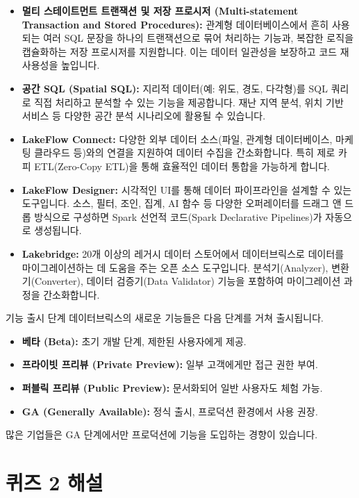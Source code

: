 \documentclass[11pt,a4paper]{article}
\begin{document}
\begin{itemize}
    \item \textbf{멀티 스테이트먼트 트랜잭션 및 저장 프로시저 (Multi-statement Transaction and Stored Procedures):} 관계형 데이터베이스에서 흔히 사용되는 여러 SQL 문장을 하나의 트랜잭션으로 묶어 처리하는 기능과, 복잡한 로직을 캡슐화하는 저장 프로시저를 지원합니다. 이는 데이터 일관성을 보장하고 코드 재사용성을 높입니다.
    \item \textbf{공간 SQL (Spatial SQL):} 지리적 데이터(예: 위도, 경도, 다각형)를 SQL 쿼리로 직접 처리하고 분석할 수 있는 기능을 제공합니다. 재난 지역 분석, 위치 기반 서비스 등 다양한 공간 분석 시나리오에 활용될 수 있습니다.
    \item \textbf{LakeFlow Connect:} 다양한 외부 데이터 소스(파일, 관계형 데이터베이스, 마케팅 클라우드 등)와의 연결을 지원하여 데이터 수집을 간소화합니다. 특히 제로 카피 ETL(Zero-Copy ETL)을 통해 효율적인 데이터 통합을 가능하게 합니다.
    \item \textbf{LakeFlow Designer:} 시각적인 UI를 통해 데이터 파이프라인을 설계할 수 있는 도구입니다. 소스, 필터, 조인, 집계, AI 함수 등 다양한 오퍼레이터를 드래그 앤 드롭 방식으로 구성하면 Spark 선언적 코드(Spark Declarative Pipelines)가 자동으로 생성됩니다.
    \item \textbf{Lakebridge:} 20개 이상의 레거시 데이터 스토어에서 데이터브릭스로 데이터를 마이그레이션하는 데 도움을 주는 오픈 소스 도구입니다. 분석기(Analyzer), 변환기(Converter), 데이터 검증기(Data Validator) 기능을 포함하여 마이그레이션 과정을 간소화합니다.
\end{itemize}

\begin{cautionbox}{기능 출시 단계}
데이터브릭스의 새로운 기능들은 다음 단계를 거쳐 출시됩니다.
\begin{itemize}
    \item \textbf{베타 (Beta):} 초기 개발 단계, 제한된 사용자에게 제공.
    \item \textbf{프라이빗 프리뷰 (Private Preview):} 일부 고객에게만 접근 권한 부여.
    \item \textbf{퍼블릭 프리뷰 (Public Preview):} 문서화되어 일반 사용자도 체험 가능.
    \item \textbf{GA (Generally Available):} 정식 출시, 프로덕션 환경에서 사용 권장.
\end{itemize}
많은 기업들은 GA 단계에서만 프로덕션에 기능을 도입하는 경향이 있습니다.
\end{cautionbox}

\newpage
\section*{퀴즈 2 해설}
\end{document}

